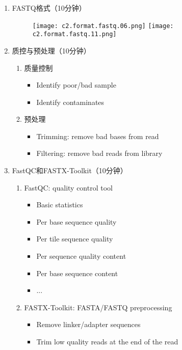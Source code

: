 \documentclass{TIJMUjiaoanSY}
\begin{document}
\noindent
\begin{enumerate}
  \item FASTQ格式（10分钟）
    \begin{figure}[ht]
      \centering
      \texttt{[image: c2.format.fastq.06.png]}
      \texttt{[image: c2.format.fastq.11.png]}
    \end{figure}
  \item 质控与预处理（10分钟）
    \begin{enumerate}
      \item 质量控制
        \begin{itemize}
          \item Identify poor/bad sample
          \item Identify contaminates
        \end{itemize}
      \item 预处理
        \begin{itemize}
          \item Trimming: remove bad bases from read
          \item Filtering: remove bad reads from library
        \end{itemize}
    \end{enumerate}
  \item FastQC和FASTX-Toolkit（10分钟）
    \begin{multicols}{2}
      \begin{enumerate}
        \item FastQC: quality control tool
          \begin{itemize}
            \item Basic statistics
            \item Per base sequence quality
            \item Per tile sequence quality
            \item Per sequence quality content
            \item Per base sequence content
            \item ...
         \end{itemize}
       \item FASTX-Toolkit: FASTA/FASTQ preprocessing
         \begin{itemize}
           \item Remove linker/adapter sequences
           \item Trim low quality reads at the end of the read

\end{itemize}
\end{enumerate}
\end{multicols}
\end{enumerate}
\end{document}
